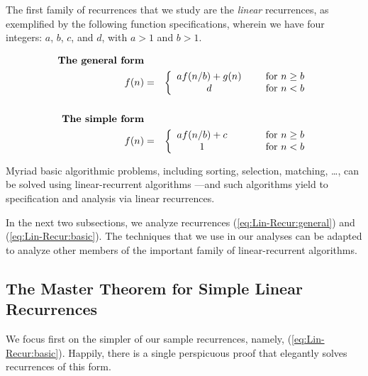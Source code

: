 The first family of recurrences that we study are the {\em linear} recurrences, as exemplified by the following function specifications, wherein we have four integers: $a$, $b$, $c$, and $d$, with $a>1$ and $b>1$.

\begin{eqnarray}
\nonumber
\mbox{\bf The general form} & & \\
\label{eq:Lin-Recur:general}
f(n) & = & \left\{
\begin{array}{cl}
a f(n/b) + g(n) & \hspace*{.2in} \mbox{for } n \geq b \\
                    d & \hspace*{.2in} \mbox{for } n < b
\end{array}
\right. \\
\nonumber
  & & \\
\nonumber
\mbox{\bf The simple form} & & \\
\label{eq:Lin-Recur:basic}
f(n) & = & \left\{
\begin{array}{cl}
a f(n/b) + c & \hspace*{.4in} \mbox{for } n \geq b \\
               1 & \hspace*{.4in} \mbox{for } n < b
\end{array}
\right.
\end{eqnarray}


\smallskip

Myriad basic algorithmic problems, including sorting, selection, matching, \ldots, can be solved using linear-recurrent algorithms \cite{CLRS}---and such algorithms yield to specification and analysis via linear recurrences.

\smallskip

In the next two subsections, we analyze recurrences (\ref{eq:Lin-Recur:general}) and (\ref{eq:Lin-Recur:basic}).  The techniques that we use in our analyses can be adapted to analyze other members of the important family of linear-recurrent algorithms.


\subsection{The Master Theorem for Simple Linear Recurrences} 
\label{sec:masterTheorem}
\label{sec:linear-recurrence-basic}

We focus first on the simpler of our sample recurrences, namely, (\ref{eq:Lin-Recur:basic}).  Happily, there is a single perspicuous proof that elegantly solves recurrences of this form.

